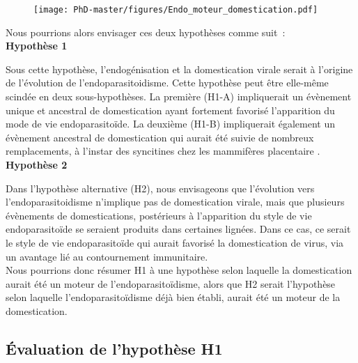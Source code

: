 \begin{figure}[H]
\captionsetup{font=footnotesize}
 \centering
  \texttt{[image: PhD-master/figures/Endo\_moteur\_domestication.pdf]}
\label{figure:Endo_moteur_domestication}
\end{figure}

Nous pourrions alors envisager ces deux hypothèses comme suit : \\

\textbf{Hypothèse 1}

Sous cette hypothèse, l'endogénisation et la domestication virale serait à l'origine de l'évolution de l'endoparasitoidisme. Cette hypothèse  peut être elle-même scindée en deux sous-hypothèses. La première (H1-A) impliquerait un évènement unique et ancestral de domestication ayant fortement favorisé l'apparition du mode de vie endoparasitoïde. La deuxième (H1-B) impliquerait également un évènement ancestral de domestication qui aurait été suivie de nombreux remplacements, à l'instar des syncitines chez les mammifères placentaire \citep{lavialle_paleovirology_2013}.\\ 

\textbf{Hypothèse 2}

Dans l'hypothèse alternative (H2), nous envisageons que l'évolution vers l'endoparasitoidisme n'implique pas de domestication virale, mais que plusieurs évènements de domestications, postérieurs à l'apparition du style de vie endoparasitoïde se seraient produits dans certaines lignées. Dans ce cas, ce serait le style de vie endoparasitoïde qui aurait favorisé la domestication de virus, via un avantage lié au contournement immunitaire. \\

Nous pourrions donc résumer H1 à une hypothèse selon laquelle la domestication aurait été un moteur de l'endoparasitoïdisme, alors que H2 serait l'hypothèse selon laquelle l'endoparasitoïdisme déjà bien établi, aurait été un moteur de la domestication.


\subsection{Évaluation de l'hypothèse H1}

